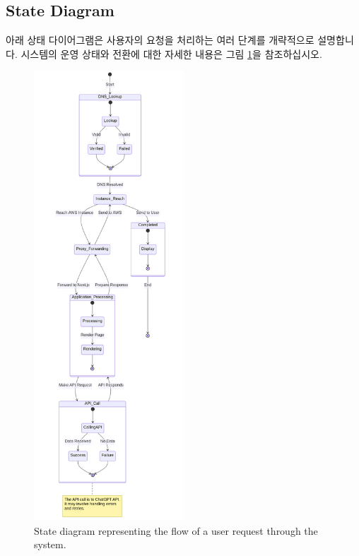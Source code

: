 \documentclass[a4paper, 12pt]{article}
\begin{document}
\subsection{State Diagram}

아래 상태 다이어그램은 사용자의 요청을 처리하는 여러 단계를 개략적으로 설명합니다. 시스템의 운영 상태와 전환에 대한 자세한 내용은 그림 \ref{fig:state_diagram}을 참조하십시오.

\begin{figure}[H]
\centering
\includegraphics[width=0.5\textwidth]{img/state_diagram.png}
\caption{State diagram representing the flow of a user request through the system.}
\label{fig:state_diagram}
\end{figure}
\end{document}
